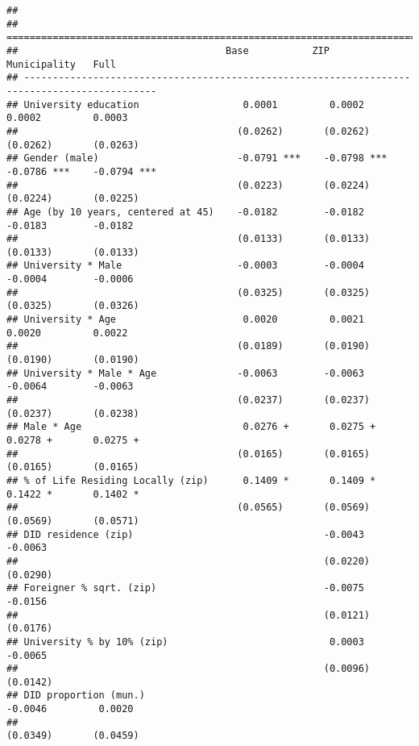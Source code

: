 \documentclass[
]{article}
\begin{document}
\begin{verbatim}
## 
## =============================================================================================
##                                    Base           ZIP            Municipality   Full         
## ---------------------------------------------------------------------------------------------
## University education                  0.0001         0.0002         0.0002         0.0003    
##                                      (0.0262)       (0.0262)       (0.0262)       (0.0263)   
## Gender (male)                        -0.0791 ***    -0.0798 ***    -0.0786 ***    -0.0794 ***
##                                      (0.0223)       (0.0224)       (0.0224)       (0.0225)   
## Age (by 10 years, centered at 45)    -0.0182        -0.0182        -0.0183        -0.0182    
##                                      (0.0133)       (0.0133)       (0.0133)       (0.0133)   
## University * Male                    -0.0003        -0.0004        -0.0004        -0.0006    
##                                      (0.0325)       (0.0325)       (0.0325)       (0.0326)   
## University * Age                      0.0020         0.0021         0.0020         0.0022    
##                                      (0.0189)       (0.0190)       (0.0190)       (0.0190)   
## University * Male * Age              -0.0063        -0.0063        -0.0064        -0.0063    
##                                      (0.0237)       (0.0237)       (0.0237)       (0.0238)   
## Male * Age                            0.0276 +       0.0275 +       0.0278 +       0.0275 +  
##                                      (0.0165)       (0.0165)       (0.0165)       (0.0165)   
## % of Life Residing Locally (zip)      0.1409 *       0.1409 *       0.1422 *       0.1402 *  
##                                      (0.0565)       (0.0569)       (0.0569)       (0.0571)   
## DID residence (zip)                                 -0.0043                       -0.0063    
##                                                     (0.0220)                      (0.0290)   
## Foreigner % sqrt. (zip)                             -0.0075                       -0.0156    
##                                                     (0.0121)                      (0.0176)   
## University % by 10% (zip)                            0.0003                       -0.0065    
##                                                     (0.0096)                      (0.0142)   
## DID proportion (mun.)                                              -0.0046         0.0020    
##                                                                    (0.0349)       (0.0459)   

\end{verbatim}
\end{document}
